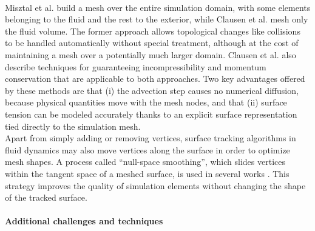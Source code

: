\\
Misztal et al. \cite{Misztal2012a,Misztal2012b} build a mesh over the entire simulation domain, with some elements belonging to the fluid and the rest to the exterior, while Clausen et al. \cite{Clausen2013} mesh only the fluid volume.
The former approach allows topological changes like collisions to be handled automatically without special treatment, although at the cost of maintaining a mesh over a potentially much larger domain.
Clausen et al. also describe techniques for guaranteeing incompressibility and momentum conservation that are applicable to both approaches. 
Two key advantages offered by these methods are that (i) the advection step causes no numerical diffusion, because physical quantities move with the mesh nodes, and that (ii) surface tension can be modeled accurately thanks to an explicit surface representation tied directly to the simulation mesh.
\\
Apart from simply adding or removing vertices, surface tracking algorithms in fluid dynamics may also move vertices along the surface in order to optimize mesh shapes.
A process called ``null-space smoothing'', which slides vertices within the tangent space of a meshed surface, is used in several works \cite{Jiao2007,Brochu2009,Brochu2010,Wicke2010,Clausen2013}.
This strategy improves the quality of simulation elements without changing the shape of the tracked surface.

\paragraph*{Additional challenges and techniques}

